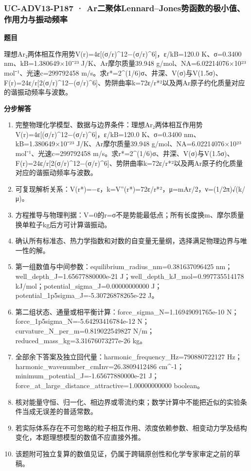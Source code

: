 \documentclass[UTF8,11pt,a4paper]{ctexart}
\begin{document}
\subsubsection*{UC-ADV13-P187 · Ar二聚体Lennard–Jones势函数的极小值、作用力与振动频率}
\noindent\textbf{题目}\par
理想Ar₂两体相互作用势V(r)=4ε[(σ/r)\textasciicircum{}12−(σ/r)\textasciicircum{}6]，ε/kB=120.0 K、σ=0.3400 nm、kB=1.380649×10⁻²³ J/K、Ar摩尔质量39.948 g/mol、NA=6.02214076×10²³ mol⁻¹、光速c=299792458 m/s。求r*=2\textasciicircum{}(1/6)σ、井深、V(σ)与V(1.5σ)、F(r)=24ε/r[2(σ/r)\textasciicircum{}12−(σ/r)\textasciicircum{}6]、势阱曲率k=72ε/r*²以及两Ar原子约化质量对应的谐振动频率与波数。\par
\medskip\noindent\textbf{分步解答}
\begin{enumerate}
\item 完整物理化学模型、数据与边界条件：理想Ar₂两体相互作用势V(r)=4ε[(σ/r)\textasciicircum{}12−(σ/r)\textasciicircum{}6]，ε/kB=120.0 K、σ=0.3400 nm、kB=1.380649×10⁻²³ J/K、Ar摩尔质量39.948 g/mol、NA=6.02214076×10²³ mol⁻¹、光速c=299792458 m/s。求r*=2\textasciicircum{}(1/6)σ、井深、V(σ)与V(1.5σ)、F(r)=24ε/r[2(σ/r)\textasciicircum{}12−(σ/r)\textasciicircum{}6]、势阱曲率k=72ε/r*²以及两Ar原子约化质量对应的谐振动频率与波数。
\item 可复现解析关系：V(r*)=−ε，k=V''(r*)=72ε/r*²，μ=mAr/2，ν=(1/2π)√(k/μ)。
\item 方程推导与物理判据：V=0的r=σ不是势能最低点；所有长度换m、摩尔质量换单粒子kg后方可计算谐振动。
\item 确认所有标准态、热力学指数和对数的自变量无量纲，选择满足物理边界与唯一性的解。
\item 第一组数值与中间参数：equilibrium\_radius\_nm=0.381637096425 nm；well\_depth\_J=1.65677880000e-21 J；well\_depth\_kJ\_mol=0.997735514178 kJ/mol；potential\_sigma\_J=0.00000000000 J；potential\_1p5sigma\_J=-5.30726878265e-22 J。
\item 第二组状态、通量或相平衡计算：force\_sigma\_N=1.16949091765e-10 N；force\_1p5sigma\_N=-5.64293416784e-12 N；curvature\_N\_per\_m=0.819022549827 N/m；reduced\_mass\_kg=3.31676073277e-26 kg。
\item 全部余下答案及独立回代量：harmonic\_frequency\_Hz=790880722127 Hz；harmonic\_wavenumber\_cmInv=26.3809412486 cm\textasciicircum{}-1；minimum\_potential\_J=-1.65677880000e-21 J；force\_at\_large\_distance\_attractive=1.00000000000 boolean。
\item 核对能量守恒、归一化、相边界或零流约束；数学计算中不能把近似的实验条件当成无误差的普适常数。
\item 若实际体系存在不可忽略的粒子相互作用、浓度依赖参数、相变动力学及结构变化，本题理想模型的数值不应直接外推。
\item 该题附可独立复算的数值见证，仍属于跨辑原创性和化学专家审定之前的草稿。
\end{enumerate}
\end{document}
